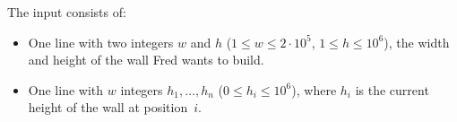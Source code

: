 
	The input consists of:
	\begin{itemize}
		\item One line with two integers $w$ and $h$ ($1\leq w\leq2\cdot10^5$, $1\leq h\leq10^6$), the width and height of the wall Fred wants to build.
		\item One line with $w$ integers $h_1,\dots,h_n$ ($0\leq h_i\leq 10^6$), where $h_i$ is the current height of the wall at position~$i$.
	\end{itemize}
